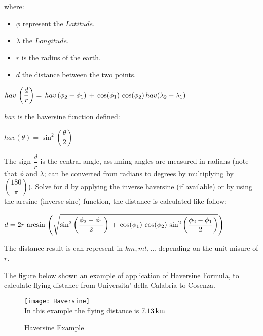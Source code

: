 \documentclass[tesi]{subfiles}
\begin{document}
where:
\begin{itemize}
\item $\phi$ represent the $Latitude$.
\item $\lambda$ the $Longitude$.
\item $r$ is the radius of the earth.
\item $d$ the distance between the two points.
\end{itemize} 
\begin{center}
$ hav \thinspace \left(\dfrac{d}{r}\right) = \thinspace hav \thinspace (\phi_{2} - \phi_{1}) \thinspace + \thinspace \cos (\phi_{1}) \thinspace \cos(\phi_{2}) \thinspace hav(\lambda_{2} - \lambda_{1})$
\end{center}
$hav$ is the haversine function defined:

\begin{center}
$hav(\theta) = \sin^{2} \left(\dfrac{\theta}{2}\right)$
\end{center}

The sign $\dfrac{d}{r}$ is the central angle, assuming angles are measured in radians (note that $\phi$ and $\lambda$; can be converted from radians to degrees by multiplying by $\left(\dfrac{180}{\pi}\right)$).
Solve for d by applying the inverse haversine (if available) or by using the arcsine (inverse sine) function, the distance is calculated like follow:

\begin{center}
 $d = 2r \thinspace \arcsin \thinspace \left(\sqrt{\sin^{2} \left(\dfrac{\phi_{2} - \phi_{1}}{2}\right) \thinspace + \thinspace \cos (\phi_{1}) \thinspace \cos(\phi_{2}) \thinspace \sin^{2} \left(\dfrac{\phi_{2} - \phi_{1}}{2}\right) }\right) $
\end{center}
The distance result is can represent in $km, mt, ...$ depending on the unit misure of $r$.

The figure below shown an example of application of Haversine Formula, to calculate flying distance from Universita' della Calabria to Cosenza.

\begin{figure}[H]	
\centering
\texttt{[image: Haversine]} 
\\In this example the flying distance is $7.13 \thinspace \si{km}$
 \caption{Haversine Example}
  \label{fig:Haversine Example}
\end{figure}
\end{document}
